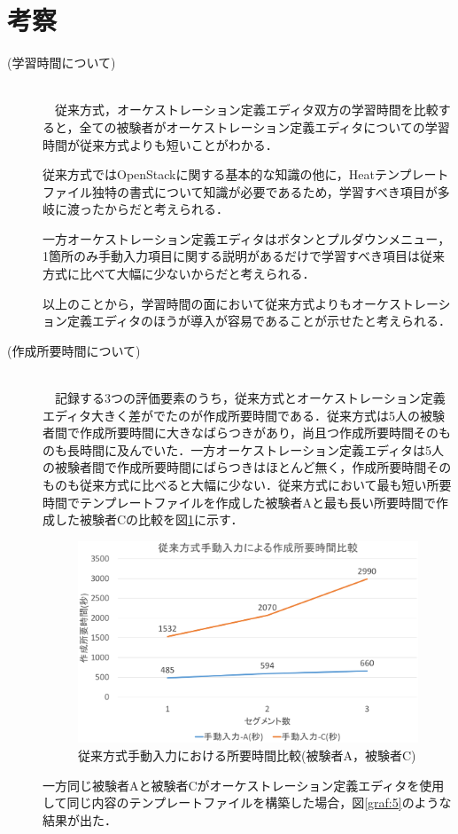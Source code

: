 \documentclass[mingoth]{kut-paper}		%
\begin{document}
	\section{考察}
	\begin{description}
		\item[(学習時間について)]\mbox{}\\ 　従来方式，オーケストレーション定義エディタ双方の学習時間を比較すると，全ての被験者がオーケストレーション定義エディタについての学習時間が従来方式よりも短いことがわかる．
		
		従来方式ではOpenStackに関する基本的な知識の他に，Heatテンプレートファイル独特の書式について知識が必要であるため，学習すべき項目が多岐に渡ったからだと考えられる．
		
		一方オーケストレーション定義エディタはボタンとプルダウンメニュー，1箇所のみ手動入力項目に関する説明があるだけで学習すべき項目は従来方式に比べて大幅に少ないからだと考えられる．
		
		以上のことから，学習時間の面において従来方式よりもオーケストレーション定義エディタのほうが導入が容易であることが示せたと考えられる．
		
		\item[(作成所要時間について)]\mbox{}\\ 　記録する3つの評価要素のうち，従来方式とオーケストレーション定義エディタ大きく差がでたのが作成所要時間である．従来方式は5人の被験者間で作成所要時間に大きなばらつきがあり，尚且つ作成所要時間そのものも長時間に及んでいた．一方オーケストレーション定義エディタは5人の被験者間で作成所要時間にばらつきはほとんど無く，作成所要時間そのものも従来方式に比べると大幅に少ない．従来方式において最も短い所要時間でテンプレートファイルを作成した被験者Aと最も長い所要時間で作成した被験者Cの比較を図\ref{graf:4}に示す．
		
		\begin{figure}[H]
			\begin{center}
				\includegraphics[scale=0.45]{Document/ManualComparisonAC.eps}
				\caption{従来方式手動入力における所要時間比較(被験者A，被験者C)}
				\label{graf:4}
			\end{center}
		\end{figure}
		\newpage
		一方同じ被験者Aと被験者Cがオーケストレーション定義エディタを使用して同じ内容のテンプレートファイルを構築した場合，図\ref{graf:5}のような結果が出た．
			

\end{description}
\end{document}
